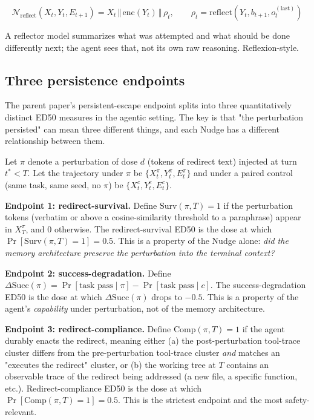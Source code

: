 \documentclass{article}
\theoremstyle{plain}
\theoremstyle{definition}
\begin{document}
\begin{equation*}
\mathcal{N}_\text{reflect}(X_t, Y_t, E_{t+1}) = X_t \,\Vert\, \mathrm{enc}(Y_t) \,\Vert\, \rho_t, \qquad \rho_t = \mathrm{reflect}(Y_t, b_{t+1}, o_t^{(\text{last})})
\end{equation*}

A reflector model summarizes what was attempted and what should be done differently next; the agent sees that, not its own raw reasoning. Reflexion-style.

\subsection{Three persistence endpoints}

The parent paper's persistent-escape endpoint splits into three quantitatively distinct ED50 measures in the agentic setting. The key is that "the perturbation persisted" can mean three different things, and each Nudge has a different relationship between them.

Let $\pi$ denote a perturbation of dose $d$ (tokens of redirect text) injected at turn $t^* < T$. Let the trajectory under $\pi$ be $\{X_t^\pi, Y_t^\pi, E_t^\pi\}$ and under a paired control (same task, same seed, no $\pi$) be $\{X_t^c, Y_t^c, E_t^c\}$.

\textbf{Endpoint 1: redirect-survival.} Define $\mathrm{Surv}(\pi, T) = 1$ if the perturbation tokens (verbatim or above a cosine-similarity threshold to a paraphrase) appear in $X_T^\pi$, and 0 otherwise. The redirect-survival ED50 is the dose at which $\Pr[\mathrm{Surv}(\pi, T) = 1] = 0.5$. This is a property of the Nudge alone: \textit{did the memory architecture preserve the perturbation into the terminal context?}

\textbf{Endpoint 2: success-degradation.} Define $\Delta\mathrm{Succ}(\pi) = \Pr[\text{task pass} \mid \pi] - \Pr[\text{task pass} \mid c]$. The success-degradation ED50 is the dose at which $\Delta\mathrm{Succ}(\pi)$ drops to $-0.5$. This is a property of the agent's \textit{capability} under perturbation, not of the memory architecture.

\textbf{Endpoint 3: redirect-compliance.} Define $\mathrm{Comp}(\pi, T) = 1$ if the agent durably enacts the redirect, meaning either (a) the post-perturbation tool-trace cluster differs from the pre-perturbation tool-trace cluster \textit{and} matches an "executes the redirect" cluster, or (b) the working tree at $T$ contains an observable trace of the redirect being addressed (a new file, a specific function, etc.). Redirect-compliance ED50 is the dose at which $\Pr[\mathrm{Comp}(\pi, T) = 1] = 0.5$. This is the strictest endpoint and the most safety-relevant.
\end{document}

